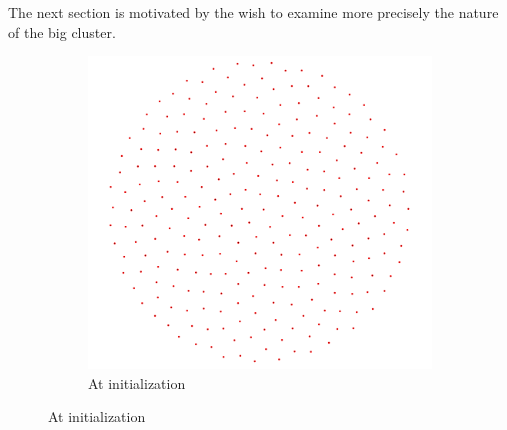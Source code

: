 
The next section is motivated by the wish to examine more precisely the nature of the big cluster.  \\

\begin{figure}[H]
\centering
\begin{subfigure}[b]{0.62\textwidth}
   \includegraphics[width=\linewidth]{images/conv2-fc1-init.png}
   \caption{At initialization}
   \label{fig:conv2-fc1-init} 
\end{subfigure}


\end{figure}
